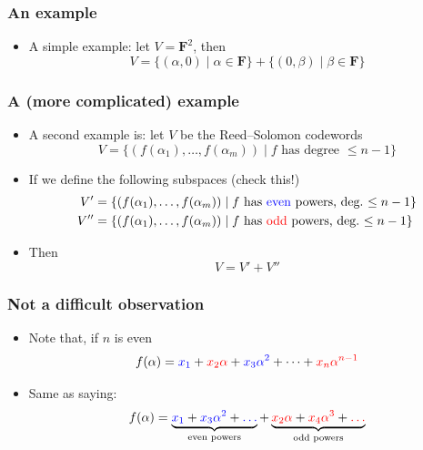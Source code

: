 \documentclass{beamer}
\newcommand{\field}{\mathbf{F}}
\newcommand{\blue}[1]{{\color{blue}#1}}
\newcommand{\red}[1]{{\color{red}#1}}
\begin{document}
    \begin{frame}
        \frametitle{An example}
        \begin{itemize}\itemsep=12pt
            \item A simple example: let $V = \field^2$, then
            \[
                V = \{(\alpha, 0) \mid \alpha \in \field\} + \{(0, \beta) \mid \beta \in \field\}
            \]
        \end{itemize}
	\end{frame}

    \begin{frame}
        \frametitle{A (more complicated) example}
        \begin{itemize}\itemsep=12pt
            \item A second example is: let $V$ be the Reed--Solomon codewords
            \[
                V = \{(f(\alpha_1), \dots, f(\alpha_m)) \mid \text{$f$ has degree $\le n-1$}\}
            \]

            \pause

            \item If we define the following subspaces (check this!)
            \[
                \begin{aligned}
                    V' &= \{(f(\alpha_1), \dots, f(\alpha_m)) \mid \text{$f$ has \blue{even} powers, deg.\ $\le n-1$}\}\\
                    V'' &= \{(f(\alpha_1), \dots, f(\alpha_m)) \mid \text{$f$ has \red{odd} powers, deg.\ $\le n-1$}\}
                \end{aligned}
            \]

            \item Then
            \[
                V = V' + V''
            \]
        \end{itemize}
	\end{frame}


    \begin{frame}
        \frametitle{Not a difficult observation}
        \begin{itemize}\itemsep=12pt
            \item Note that, if $n$ is even
            \[
                f(\alpha) = \blue{x_1} + \red{x_2\alpha} + \blue{x_3\alpha^2} + \dots + \red{x_n \alpha^{n-1}}
            \]

            \pause

            \item Same as saying:
            \[
                f(\alpha) = \underbrace{\blue{x_1} + \blue{x_3\alpha^2} + \blue{\dots}}_\text{even powers}
                    + \underbrace{\red{x_2\alpha} + \red{x_4\alpha^3} + \red{\dots}}_\text{odd powers}
            \]
        \end{itemize}
	\end{frame}
\end{document}
